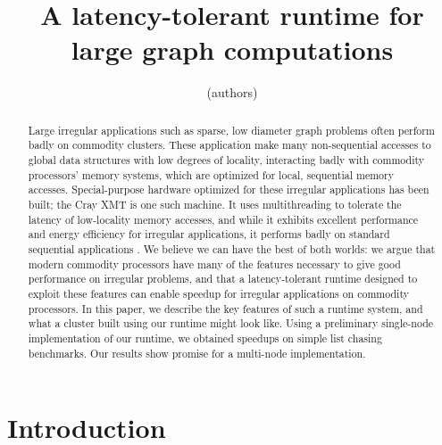 \documentclass{acm_proc_article-sp}
\begin{document}
\title{A latency-tolerant runtime for large graph computations}

\author{
(authors)
}

\maketitle
\begin{abstract}

  Large irregular applications such as sparse, low diameter graph problems often
  perform badly on commodity clusters. These application make many
  non-sequential accesses to global data structures with low degrees of
  locality, interacting badly with commodity processors' memory
  systems, which are optimized for local, sequential memory
  accesses. Special-purpose hardware optimized for these irregular
  applications has been built; the Cray XMT is one such machine. It
  uses multithreading to tolerate the latency of low-locality memory
  accesses, and while it exhibits excellent performance and energy
  efficiency for irregular applications, it performs badly on standard
  sequential applications . We believe we can have the best of both
  worlds: we argue that modern commodity processors have many of the
  features necessary  to give good performance on irregular problems,
  and that a latency-tolerant runtime designed to exploit these
  features can enable speedup for irregular applications on commodity
  processors. In this paper, we describe the key features of such a
  runtime system, and what a cluster built using our runtime might
  look like. Using a preliminary single-node implementation of our
  runtime, we obtained speedups on simple list chasing benchmarks. Our results show promise for a multi-node implementation.

\end{abstract}

\section{Introduction}
\end{document}
